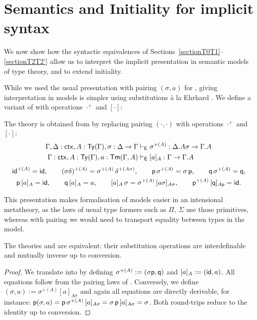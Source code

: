 \section{Semantics and Initiality for implicit syntax}\label{sec:semantics}

We now show how the syntactic equivalences of Sections~\ref{sectionT0T1}--\ref{sectionT2T2'} allow us to interpret the implicit presentation \ThyPTS{} in semantic models of type theory, and to extend initiality.

While we used the usual presentation with pairing $(\sigma, a)$ for \ThyGAT, giving interpretation in models is simpler using substitutions à la Ehrhard \cite{Ehrhard1988}. We define a variant \ThyE{} of \ThyGAT{} with operations $\cdot^+$ and $[\cdot]$:

\begin{definition}
    The theory \ThyE{} is obtained from \ThyGAT{} by replacing pairing $(\cdot,\cdot)$ with operations $\cdot^+$ and $[\cdot]$:
    \begin{align*}
        \Gamma, \Delta : \mathsf{ctx}, A : \mathsf{Ty}(\Gamma), \sigma : \Delta \rightarrow \Gamma &\vdash_{\mathsf{E}} \sigma^{+(A)} : \Delta.A\sigma \rightarrow \Gamma.A \\
        \Gamma : \mathsf{ctx}, A : \mathsf{Ty}(\Gamma), a : \mathsf{Tm}(\Gamma, A) &\vdash_{\mathsf{E}} [a]_A : \Gamma \rightarrow \Gamma.A
    \end{align*}
    \begin{gather*}
        \mathsf{id}^{+(A)} = \mathsf{id}, \qquad
        (\sigma\delta)^{+(A)} = \sigma^{+(A)}\,\delta^{+(A\sigma)}, \qquad
        \mathsf{p}\,\sigma^{+(A)} = \sigma\,\mathsf{p}, \qquad
        \mathsf{q}\,\sigma^{+(A)} = \mathsf{q}, \\
        \mathsf{p}\,[a]_A = \mathsf{id}, \qquad
        \mathsf{q}\,[a]_A = a, \qquad
        [a]_A\,\sigma = \sigma^{+(A)}\,[a\sigma]_{A\sigma}, \qquad
        \mathsf{p}^{+(A)}\,[\mathsf{q}]_{A\mathsf{p}} = \mathsf{id}.
    \end{gather*}
\end{definition}

This presentation makes formalisation of models easier in an intensional metatheory, as the laws of usual type formers such as $\Pi$, $\Sigma$ use those primitives, whereas with pairing we would need to transport equality between types in the model.

\begin{lemma}\label{lem:gat-ehrhard}
    The theories \ThyGAT{} and \ThyE{} are equivalent: their substitution operations are interdefinable and mutually inverse up to conversion.
\end{lemma}
\begin{proof}
    We translate \ThyE{} into \ThyGAT{} by defining $\sigma^{+(A)} := (\sigma\mathsf{p}, \mathsf{q})$ and $[a]_A := (\mathsf{id}, a)$. All equations follow from the pairing laws of \ThyGAT{}. Conversely, we define $(\sigma, a) := \sigma^{+(A)}[a]_{A\sigma}$ and again all equations are directly derivable, for instance:
    $\mathsf{p}(\sigma, a) = \mathsf{p}\,\sigma^{+(A)}\,[a]_{A\sigma} = \sigma\,\mathsf{p}\,[a]_{A\sigma} = \sigma$.
    Both round-trips reduce to the identity up to conversion.
\end{proof}

